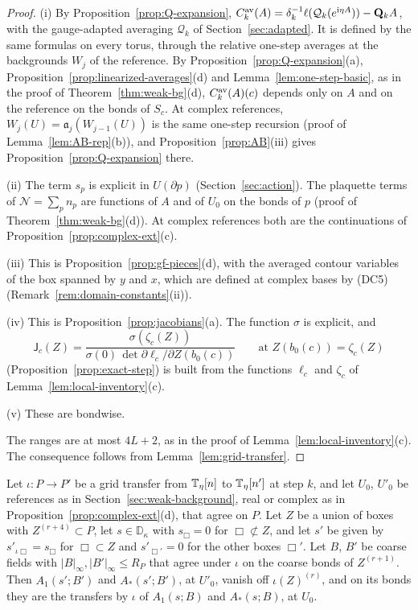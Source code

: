 \begin{proof}
(i) By Proposition~\ref{prop:Q-expansion}, $C^{\rm av}_k(A)=\delta_k^{-1}\ell(\mathcal Q_k(e^{\mathrm i\eta A}))-\mathbf Q_kA$, with the gauge-adapted averaging $\mathcal Q_k$ of Section~\ref{sec:adapted}. It is defined by the same formulas on every torus, through the relative one-step averages at the backgrounds $W_j$ of the reference. By Proposition~\ref{prop:Q-expansion}(a), Proposition~\ref{prop:linearized-averages}(d) and Lemma~\ref{lem:one-step-basic}, as in the proof of Theorem~\ref{thm:weak-bg}(d), $C^{\rm av}_k(A)(c)$ depends only on $A$ and on the reference on the bonds of $S_c$. At complex references, $W_j(U)=\mathfrak a_j(W_{j-1}(U))$ is the same one-step recursion (proof of Lemma~\ref{lem:AB-rep}(b)), and Proposition~\ref{prop:AB}(iii) gives Proposition~\ref{prop:Q-expansion} there.

(ii) The term $s_p$ is explicit in $U(\partial p)$ (Section~\ref{sec:action}). The plaquette terms of $\mathcal N=\sum_pn_p$ are functions of $A$ and of $U_0$ on the bonds of $p$ (proof of Theorem~\ref{thm:weak-bg}(d)). At complex references both are the continuations of Proposition~\ref{prop:complex-ext}(c).

(iii) This is Proposition~\ref{prop:gf-pieces}(d), with the averaged contour variables of the box spanned by $y$ and $x$, which are defined at complex bases by (DC5) (Remark~\ref{rem:domain-constants}(ii)).

(iv) This is Proposition~\ref{prop:jacobians}(a). The function $\sigma$ is explicit, and
\[
\mathsf J_c(Z)=\frac{\sigma(\zeta_c(Z))}{\sigma(0)\,\det\partial\ell_c/\partial Z(b_0(c))}\qquad\text{at }Z(b_0(c))=\zeta_c(Z)
\]
(Proposition~\ref{prop:exact-step}) is built from the functions $\ell_c$ and $\zeta_c$ of Lemma~\ref{lem:local-inventory}(c).

(v) These are bondwise.

The ranges are at most $4L+2$, as in the proof of Lemma~\ref{lem:local-inventory}(c). The consequence follows from Lemma~\ref{lem:grid-transfer}.
\end{proof}

\begin{lemma}\label{lem:gl-bg}
Let $\iota:P\to P'$ be a grid transfer from $\mathbb T_\eta[n]$ to $\mathbb T_\eta[n']$ at step $k$, and let $U_0$, $U'_0$ be references as in Section~\ref{sec:weak-background}, real or complex as in Proposition~\ref{prop:complex-ext}(d), that agree on $P$. Let $Z$ be a union of boxes with $Z^{(r+4)}\subset P$, let $s\in\mathbb D_\kappa$ with $s_\Box=0$ for $\Box\not\subset Z$, and let $s'$ be given by $s'_{\iota\Box}=s_\Box$ for $\Box\subset Z$ and $s'_{\Box'}=0$ for the other boxes $\Box'$. Let $B$, $B'$ be coarse fields with $|B|_\infty,|B'|_\infty\le R_P$ that agree under $\iota$ on the coarse bonds of $Z^{(r+1)}$. Then $A_1(s';B')$ and $A_*(s';B')$, at $U'_0$, vanish off $\iota(Z)^{(r)}$, and on its bonds they are the transfers by $\iota$ of $A_1(s;B)$ and $A_*(s;B)$, at $U_0$.
\end{lemma}

